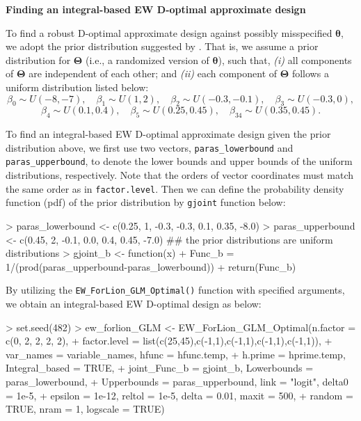 \medskip
\noindent
{\bf Finding an integral-based EW D-optimal approximate design}
\smallskip

\noindent
To find a robust D-optimal approximate design against possibly misspecified $\boldsymbol{\theta}$, we adopt the prior distribution suggested by 
\cite{huang2024forlion}. That is, we assume a prior distribution for $\boldsymbol{\Theta}$ (i.e., a randomized version of $\boldsymbol{\theta}$), such that, {\it (i)} all components of $\boldsymbol{\Theta}$ are independent of each other; and {\it (ii)} each component of $\boldsymbol{\Theta}$ follows a uniform distribution listed below:
$$\beta_0 \sim U(-8,-7),\quad \beta_1 \sim U(1,2), \quad \beta_2 \sim U(-0.3,-0.1), \quad  \beta_3 \sim U(-0.3,0), $$ 
$$ \beta_4 \sim U(0.1,0.4) , \quad \beta_5 \sim U(0.25, 0.45),\quad \beta_{34} \sim U(0.35,0.45).$$ 

To find an integral-based EW D-optimal approximate design given the prior distribution above, we first use two vectors, {\tt paras\_lowerbound} and {\tt paras\_upperbound}, to denote the lower bounds and upper bounds of the uniform distributions, respectively. Note that the orders of vector coordinates must match the same order as in {\tt factor.level}. Then we can define the probability density function (pdf) of the prior distribution by \verb|gjoint| function  below: 

\begin{example}
> paras_lowerbound <- c(0.25, 1, -0.3, -0.3, 0.1, 0.35, -8.0)
> paras_upperbound <- c(0.45, 2, -0.1,  0.0, 0.4, 0.45, -7.0)
## the prior distributions are uniform distributions
> gjoint_b <- function(x) {
+             Func_b = 1/(prod(paras_upperbound-paras_lowerbound))
+             return(Func_b)
}  
\end{example}

By utilizing the \verb|EW_ForLion_GLM_Optimal()| function with specified arguments, we obtain an integral-based EW D-optimal design as below:
\begin{example}
> set.seed(482)
> ew_forlion_GLM <- EW_ForLion_GLM_Optimal(n.factor = c(0, 2, 2, 2, 2), 
+                   factor.level = list(c(25,45),c(-1,1),c(-1,1),c(-1,1),c(-1,1)), 
+                   var_names = variable_names, hfunc = hfunc.temp, 
+                   h.prime = hprime.temp, Integral_based = TRUE, 
+                   joint_Func_b = gjoint_b, Lowerbounds = paras_lowerbound, 
+                   Upperbounds = paras_upperbound, link = "logit", delta0 = 1e-5, 
+                   epsilon = 1e-12, reltol = 1e-5, delta = 0.01, maxit = 500, 
+                   random = TRUE, nram = 1, logscale = TRUE)
\end{example}

